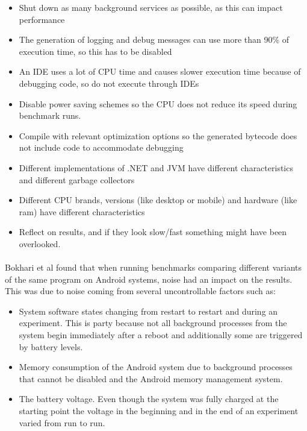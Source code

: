 \begin{itemize}
    \item Shut down as many background services as possible, as this can impact performance
    \item The generation of logging and debug messages can use more than 90\% of execution time, so this has to be disabled
    \item An IDE uses a lot of CPU time and causes slower execution time because of debugging code, so do not execute through IDEs
    \item Disable power saving schemes so the CPU does not reduce its speed during benchmark runs.
    \item Compile with relevant optimization options so the generated bytecode does not include code to accommodate debugging
    \item Different implementations of .NET and JVM have different characteristics and different garbage collectors
    \item Different CPU brands, versions (like desktop or mobile) and hardware (like ram) have different characteristics
    \item Reflect on results, and if they look slow/fast something might have been overlooked.
\end{itemize}


\paragraph*{}
Bokhari et al\cite{Bokhari2020r3} found that when running benchmarks comparing different variants of the same program on Android systems, noise had an impact on the results. This was due to noise coming from several uncontrollable factors such as:\cite{Bokhari2020r3}

\begin{itemize}
    \item System software states changing from restart to restart and during an experiment. This is party because not all background processes from the system begin immediately after a reboot and additionally some are triggered by battery levels.
    \item Memory consumption of the Android system due to background processes that cannot be disabled and the Android memory management system.
    \item The battery voltage. Even though the system was fully charged at the starting point the voltage in the beginning and in the end of an experiment varied from run to run.
\end{itemize}

